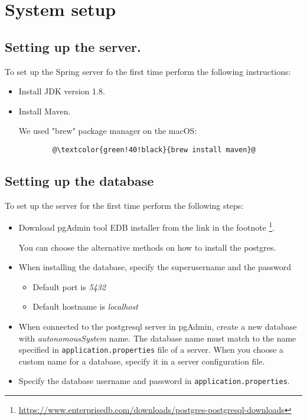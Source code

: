 \chapter{System setup}
\label{ch:the-instructions-of-the-system.}

\section{Setting up the server.}
\label{sec:setting-up-the-server.}
To set up the Spring server fo the first time perform the following instructions:
\begin{itemize}
    \item Install JDK version 1.8.
    \item Install Maven.

    We used "brew" package manager on the macOS:
    \begin{lstlisting}
        @\textcolor{green!40!black}{brew install maven}@
    \end{lstlisting}
\end{itemize}
\section{Setting up the database}
\label{sec:setting-up-the-databse.}
To set up the server for the first time perform the following steps:
\begin{itemize}
    \item Download pgAdmin tool EDB installer from the link in the
    footnote \footnote{\url{https://www.enterprisedb.com/downloads/postgres-postgresql-downloads}}.

    You can choose the alternative methods on how to install the postgres.
    \item When installing the database, specify the superusername and the password
    \begin{itemize}
        \item Default port is \emph{5432}
        \item Default hostname is \emph{localhost}
    \end{itemize}
    \item When connected to the postgresql server in pgAdmin, create a new database with \emph{autonomousSystem} name.
    The database name must match to the name specified in \texttt{application.properties} file of a server.
    When you choose a custom name for a database, specify it in a server configuration file.
    \item Specify the database username and password in \texttt{application.properties}.
\end{itemize}
